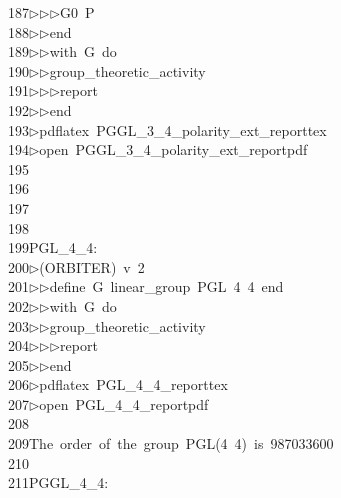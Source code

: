 \begin{tabbing}
187\>$\triangleright$\>$\triangleright$\>$\triangleright$\>G0\ P\ \\[0pt]
188\>$\triangleright$\>$\triangleright$\>end\ \\[0pt]
189\>$\triangleright$\>$\triangleright$\>with\ G\ do\ \\[0pt]
190\>$\triangleright$\>$\triangleright$\>group\_theoretic\_activity\ \\[0pt]
191\>$\triangleright$\>$\triangleright$\>$\triangleright$\>report\ \\[0pt]
192\>$\triangleright$\>$\triangleright$\>end\\[0pt]
193\>$\triangleright$\>pdflatex\ PGGL\_3\_4\_polarity\_ext\_reporttex\\[0pt]
194\>$\triangleright$\>open\ PGGL\_3\_4\_polarity\_ext\_reportpdf\\[0pt]
195\>\\[0pt]
196\>\\[0pt]
197\>\\[0pt]
198\>\\[0pt]
199\>PGL\_4\_4:\\[0pt]
200\>$\triangleright$\>(ORBITER)\ v\ 2\ \\[0pt]
201\>$\triangleright$\>$\triangleright$\>define\ G\ linear\_group\ PGL\ 4\ 4\ end\ \\[0pt]
202\>$\triangleright$\>$\triangleright$\>with\ G\ do\ \\[0pt]
203\>$\triangleright$\>$\triangleright$\>group\_theoretic\_activity\ \\[0pt]
204\>$\triangleright$\>$\triangleright$\>$\triangleright$\>report\ \\[0pt]
205\>$\triangleright$\>$\triangleright$\>end\\[0pt]
206\>$\triangleright$\>pdflatex\ PGL\_4\_4\_reporttex\\[0pt]
207\>$\triangleright$\>open\ PGL\_4\_4\_reportpdf\\[0pt]
208\>\\[0pt]
209\>The\ order\ of\ the\ group\ PGL(4\ 4)\ is\ 987033600\\[0pt]
210\>\\[0pt]
211\>PGGL\_4\_4:\\[0pt]

\end{tabbing}
